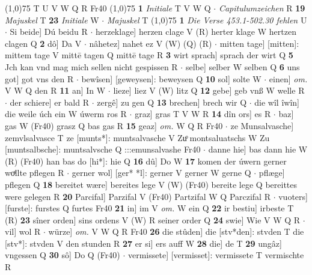 \documentclass[8pt,a4paper,notitlepage]{article}
\begin{document}
\begin{table}[ht]
\begin{minipage}[t]{0.5\linewidth}
\scriptsize
\line(1,0){75} \newline
T U V W Q R Fr40 \newline
\line(1,0){75} \newline
\textbf{1} \textit{Initiale} T V W Q   $\cdot$ \textit{Capitulumzeichen} R  \textbf{19} \textit{Majuskel} T  \textbf{23} \textit{Initiale} W   $\cdot$ \textit{Majuskel} T  \newline
\line(1,0){75} \newline
\textbf{1} \textit{Die Verse 453.1-502.30 fehlen} U   $\cdot$ Si beide] Dú beidu R  $\cdot$ herzeklage] herzen clage V (R) herter klage W hertzen clagen Q \textbf{2} dô] Da V  $\cdot$ nâhetez] nahet ez V (W) (Q) (R)  $\cdot$ mitten tage] [mitten]: mittem tage V mittē tagen Q mittē tage R \textbf{3} wirt sprach] sprach der wirt Q \textbf{5} Jch kan vnd mag mich sellen nicht gespissen R  $\cdot$ selbe] selber W selben Q \textbf{6} uns got] got vns den R  $\cdot$ bewîsen] [geweysen]: beweysen Q \textbf{10} sol] solte W  $\cdot$ einen] \textit{om.} V W Q den R \textbf{11} an] In W  $\cdot$ lieze] liez V (W) litz Q \textbf{12} gebe] geb vnß W welle R  $\cdot$ der schiere] er bald R  $\cdot$ zergê] zu gen Q \textbf{13} brechen] brech wir Q  $\cdot$ die wîl îwîn] die weile úch ein W úwerm ros R  $\cdot$ graz] gras T V W R \textbf{14} dîn ors] es R  $\cdot$ baz] gas W (Fr40) grasz Q bas gas R \textbf{15} geaz] \textit{om.} W Q R Fr40  $\cdot$ ze Munsalvasche] zemvlsalvasce T ze [munts*]: muntsalvasche V Zuͦ montsaluatschs W Zu [muntsalbsche]: muntsalvsche Q :::emunsalvashe Fr40  $\cdot$ danne hie] bas dann hie W (R) (Fr40) han bas do [hi*]: hie  Q \textbf{16} dû] Do W \textbf{17} komen der úwern gerner woͯllte pflegen R  $\cdot$ gerner wol] [ger* *l]: gerner V gerner W gerne Q  $\cdot$ pflæge] pflegen Q \textbf{18} bereitet wære] bereites lege V (W) (Fr40) bereite lege Q bereittes were gelegen R \textbf{20} Parcifal] Parzifal V (Fr40) Partzifal W Q Parczifal R  $\cdot$ vuoters] [furste]: furstes Q furtes Fr40 \textbf{21} in] im V \textit{om.} W ein Q \textbf{22} ir bestiu] irbeste T (R) \textbf{23} sîner orden] sins ordens V (W) R seiner order Q \textbf{24} swie] Wie V W Q R  $\cdot$ vil] wol R  $\cdot$ würze] \textit{om.} V W Q R Fr40 \textbf{26} die stûden] die [stv*den]: stvden T die [stv*]: stvden V den stunden R \textbf{27} er si] ers auff W \textbf{28} die] de T \textbf{29} ungâz] vngessen Q \textbf{30} sô] Do Q (Fr40)  $\cdot$ vermissete] [vermisset]: vermissete T vermischte R \newline
\end{minipage}
\end{table}
\end{document}
